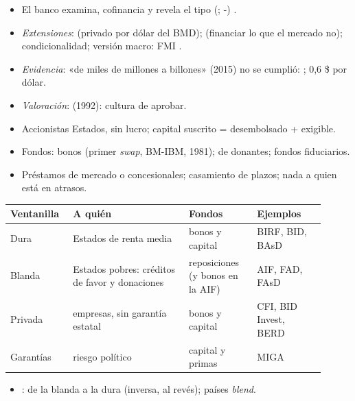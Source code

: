 \documentclass{article}
\begin{document}
\begin{columnas}
\begin{itemize}
\item El banco examina, cofinancia y revela el tipo (; -) .
\item \emph{Extensiones}:  (privado por dólar del BMD);  (financiar lo que el mercado no); condicionalidad; versión macro: FMI .
\item \emph{Evidencia}: «de miles de millones a billones» (2015) no se cumplió: ; 0,6 \$ por dólar.
\item \emph{Valoración}:  (1992): cultura de aprobar.
\end{itemize}
\begin{itemize}
\item Accionistas Estados, sin lucro; capital suscrito = desembolsado + exigible.
\item Fondos: bonos (primer \emph{swap}, BM-IBM, 1981);  de donantes; fondos fiduciarios.
\item Préstamos de mercado o concesionales; casamiento de plazos; nada a quien está en atrasos.
\end{itemize}
{\small\noindent\begin{tabular}{@{}>{\raggedright\arraybackslash}p{0.17\linewidth}|>{\raggedright\arraybackslash}p{0.34\linewidth}|>{\raggedright\arraybackslash}p{0.2\linewidth}|>{\raggedright\arraybackslash}p{0.2\linewidth}@{}}
\textbf{Ventanilla} & \textbf{A quién} & \textbf{Fondos} & \textbf{Ejemplos}\\ \hline
Dura & Estados de renta media & bonos y capital & BIRF, BID, BAsD\\
Blanda & Estados pobres: créditos de favor y donaciones & reposiciones (y bonos en la AIF) & AIF, FAD, FAsD\\
Privada & empresas, sin garantía estatal & bonos y capital & CFI, BID Invest, BERD\\
Garantías & riesgo político & capital y primas & MIGA\\
\end{tabular}\par}
\begin{itemize}
\item {}: de la blanda a la dura (inversa, al revés); países \emph{blend}.
\end{itemize}

\end{columnas}
\end{document}
